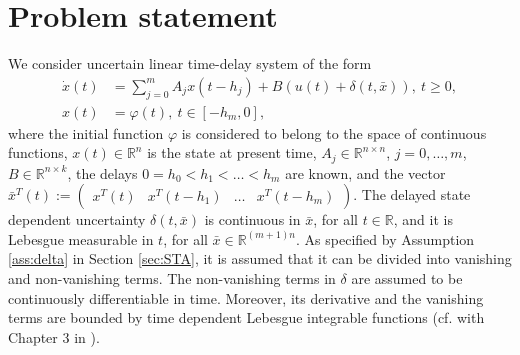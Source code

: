 \documentclass[onecolumn]{IEEEtran}
\begin{document}
\section{Problem statement}  
We  consider uncertain linear time-delay system of the form
\begin{equation}
\begin{split}
\label{ec:linear_sys}
\dot x (t)&=\sum_{j=0}^{m}A_jx(t-h_j)+B(u(t)+\delta(t,\bar x)),\:t\geq 0,\\
x(t)&=\varphi(t),\: t\in [-h_{m},0],
\end{split}
\end{equation}
where the initial function $\varphi$ is considered to belong to the space of   continuous functions, $x(t)\in \mathbb{R}^n$ is the state at present time, $A_j\in \mathbb{R}^{n\times n}$, $j=0,\ldots,m$,  $B\in \mathbb{R}^{n\times k}$,  the delays $0=h_0<h_1<\ldots <h_{m}$ are known, and the vector $\bar x^T(t):=\begin{pmatrix}
x^T(t) & x^T(t-h_1) & \ldots & x^T(t-h_m)
\end{pmatrix}$.  The delayed state dependent uncertainty $\delta(t,\bar{x})$ is continuous in $\bar{x}$, for all $t\in \mathbb{R}$,  and it is Lebesgue measurable in $t$,  for all $\bar{x}\in \mathbb{R}^{(m+1)n}$. {As specified by Assumption \ref{ass:delta} in Section \ref{sec:STA},  it is assumed that it can be divided into vanishing and non-vanishing terms.  The non-vanishing terms in $\delta$ are assumed to be continuously differentiable in time. Moreover, its derivative  and the vanishing terms are bounded by time dependent Lebesgue integrable functions (cf.  with Chapter 3 in \cite{Kolmanovskii1999})}.
\end{document}
